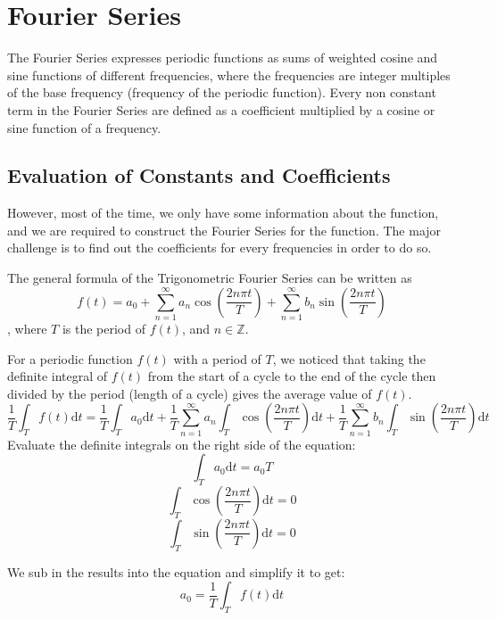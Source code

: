 \section{Fourier Series}
\indent The Fourier Series expresses periodic functions as 
sums of weighted cosine and sine functions of different frequencies, 
where the frequencies are integer multiples of the base frequency (frequency of the periodic function).
Every non constant term in the Fourier Series are defined as 
a coefficient multiplied by a cosine or sine function of a frequency.



\subsection{Evaluation of Constants and Coefficients}
\indent However, most of the time, we only have some information about the function, 
and we are required to construct the Fourier Series for the function. 
The major challenge is to find out the coefficients for every frequencies in order to do so.

\indent The general formula of the Trigonometric Fourier Series can be written as
\begin{equation}
    f(t) = a_0 + \sum_{n=1}^{\infty}a_n\cos(\frac{2n\pi t}{T}) + \sum_{n=1}^{\infty}b_n\sin(\frac{2n\pi t}{T})
    \label{equ:trig_fourier_series_expansion}
\end{equation}
, where $T$ is the period of $f(t)$, and $n\in\mathbb{Z}$.

\indent For a periodic function $f(t)$ with a period of $T$, 
we noticed that taking the definite integral of $f(t)$ from the start of a cycle to the end of the cycle
then divided by the period (length of a cycle) gives the average value of $f(t)$. 
$$  
    \frac{1}{T}     \int_{T}f(t)\mathrm{d}t
    = \frac{1}{T}   \int_{T}a_0\mathrm{d}t
    + \frac{1}{T}   \sum_{n=1}^{\infty}   a_n   \int_{T}\cos(\frac{2n\pi t}{T})\mathrm{d}t
    + \frac{1}{T}   \sum_{n=1}^{\infty}   b_n \int_{T}\sin(\frac{2n\pi t}{T})\mathrm{d}t
$$
Evaluate the definite integrals on the right side of the equation:
$$      \int_{T} a_0 \mathrm{d}t    =   a_0  T                  $$
$$      \int_{T}\cos(\frac{2n\pi t}{T})\mathrm{d}t  = 0         $$
$$      \int_{T}\sin(\frac{2n\pi t}{T})\mathrm{d}t  = 0         $$

We sub in the results into the equation and simplify it to get:
\begin{equation}
    a_0  =  \frac{1}{T} \int_{T} f(t) \mathrm{d}t
    \label{equ:fourier_series_a0_term}
\end{equation}


